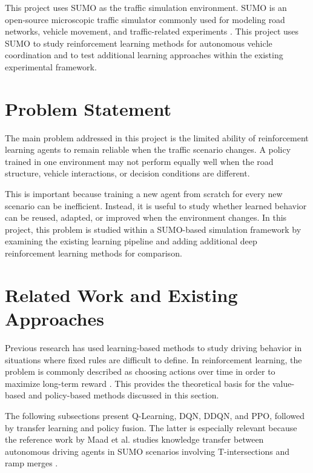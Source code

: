 \documentclass{article}
\begin{document}
This project uses SUMO as the traffic simulation environment. SUMO is an open-source microscopic traffic simulator commonly used for modeling road networks, vehicle movement, and traffic-related experiments \cite{behrisch2011sumo}. This project uses SUMO to study reinforcement learning methods for autonomous vehicle coordination and to test additional learning approaches within the existing experimental framework.

\section{Problem Statement}

The main problem addressed in this project is the limited ability of reinforcement learning agents to remain reliable when the traffic scenario changes. A policy trained in one environment may not perform equally well when the road structure, vehicle interactions, or decision conditions are different.

This is important because training a new agent from scratch for every new scenario can be inefficient. Instead, it is useful to study whether learned behavior can be reused, adapted, or improved when the environment changes. In this project, this problem is studied within a SUMO-based simulation framework by examining the existing learning pipeline and adding additional deep reinforcement learning methods for comparison.



\section{Related Work and Existing Approaches}

Previous research has used learning-based methods to study driving behavior in situations where fixed rules are difficult to define. In reinforcement learning, the problem is commonly described as choosing actions over time in order to maximize long-term reward \cite{sutton2018reinforcement}. This provides the theoretical basis for the value-based and policy-based methods discussed in this section.

The following subsections present Q-Learning, DQN, DDQN, and PPO, followed by transfer learning and policy fusion. The latter is especially relevant because the reference work by Maad et al. studies knowledge transfer between autonomous driving agents in SUMO scenarios involving T-intersections and ramp merges \cite{maad2025dynamic}.
\end{document}
